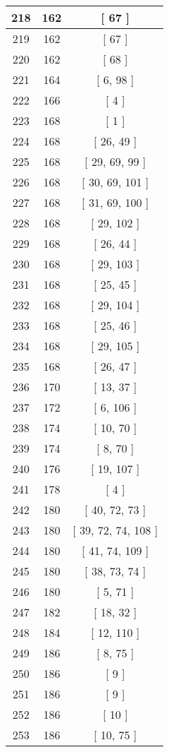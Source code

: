\begin{center}
\begin{longtable}[H]{|| c c c ||}
\hline
218 & 162 & [ 67 ] \\ 
\hline
219 & 162 & [ 67 ] \\ 
\hline
220 & 162 & [ 68 ] \\ 
\hline
221 & 164 & [ 6, 98 ] \\ 
\hline
222 & 166 & [ 4 ] \\ 
\hline
223 & 168 & [ 1 ] \\ 
\hline
224 & 168 & [ 26, 49 ] \\ 
\hline
225 & 168 & [ 29, 69, 99 ] \\ 
\hline
226 & 168 & [ 30, 69, 101 ] \\ 
\hline
227 & 168 & [ 31, 69, 100 ] \\ 
\hline
228 & 168 & [ 29, 102 ] \\ 
\hline
229 & 168 & [ 26, 44 ] \\ 
\hline
230 & 168 & [ 29, 103 ] \\ 
\hline
231 & 168 & [ 25, 45 ] \\ 
\hline
232 & 168 & [ 29, 104 ] \\ 
\hline
233 & 168 & [ 25, 46 ] \\ 
\hline
234 & 168 & [ 29, 105 ] \\ 
\hline
235 & 168 & [ 26, 47 ] \\ 
\hline
236 & 170 & [ 13, 37 ] \\ 
\hline
237 & 172 & [ 6, 106 ] \\ 
\hline
238 & 174 & [ 10, 70 ] \\ 
\hline
239 & 174 & [ 8, 70 ] \\ 
\hline
240 & 176 & [ 19, 107 ] \\ 
\hline
241 & 178 & [ 4 ] \\ 
\hline
242 & 180 & [ 40, 72, 73 ] \\ 
\hline
243 & 180 & [ 39, 72, 74, 108 ] \\ 
\hline
244 & 180 & [ 41, 74, 109 ] \\ 
\hline
245 & 180 & [ 38, 73, 74 ] \\ 
\hline
246 & 180 & [ 5, 71 ] \\ 
\hline
247 & 182 & [ 18, 32 ] \\ 
\hline
248 & 184 & [ 12, 110 ] \\ 
\hline
249 & 186 & [ 8, 75 ] \\ 
\hline
250 & 186 & [ 9 ] \\ 
\hline
251 & 186 & [ 9 ] \\ 
\hline
252 & 186 & [ 10 ] \\ 
\hline
253 & 186 & [ 10, 75 ] \\ 

\end{longtable}
\end{center}
